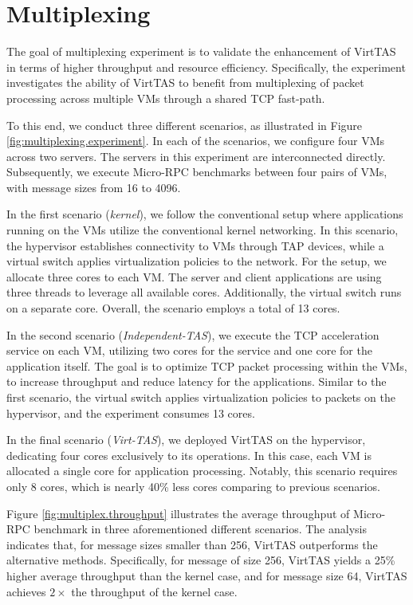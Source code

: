




\section{Multiplexing}

The goal of multiplexing experiment is to validate the enhancement of VirtTAS in terms of 
higher throughput and resource efficiency. Specifically, the experiment 
investigates the ability of VirtTAS to benefit from multiplexing of packet processing 
across multiple VMs through a shared TCP fast-path. 

To this end, we conduct three different scenarios, as illustrated in Figure 
\ref{fig:multiplexing.experiment}. In each of the scenarios, we configure four 
VMs across two servers. The servers in this experiment are interconnected directly. 
Subsequently, we execute Micro-RPC benchmarks between four pairs of VMs, 
with message sizes from 16 to 4096.


In the first scenario (\emph{kernel}), we follow the conventional 
setup where applications running on the VMs utilize the conventional kernel 
networking. In this scenario, the hypervisor establishes connectivity to VMs through 
TAP devices, while a virtual switch applies virtualization policies to the network. 
For the setup, we allocate three cores to each VM. The server and client applications 
are using three threads to leverage all available cores. 
Additionally, the virtual switch runs on a separate core. Overall, the scenario employs
a total of 13 cores. 

In the second scenario (\emph{Independent-TAS}), we execute the TCP acceleration service on each VM, 
utilizing two cores for the service and one core for the application itself. 
The goal is to optimize TCP packet processing within the VMs, 
to increase throughput and reduce latency for the applications. 
Similar to the first scenario, the virtual switch applies virtualization policies 
to packets on the hypervisor, and the experiment consumes 13 cores.


In the final scenario (\emph{Virt-TAS}), we deployed VirtTAS on the hypervisor, dedicating four 
cores exclusively to its operations. In this case, each VM is allocated a single 
core for application processing. Notably, this scenario requires only 8 cores,
which is nearly 40\% less cores comparing to previous scenarios.


Figure \ref{fig:multiplex.throughput} illustrates the average throughput of 
Micro-RPC benchmark in three aforementioned different scenarios. 
The analysis indicates that, for message sizes smaller than 256, VirtTAS outperforms 
the alternative methods. Specifically, for message of size 256, VirtTAS yields
a 25\% higher average throughput than the kernel case, and for message size 64, 
VirtTAS achieves \(2\times\) the throughput of the kernel case.

